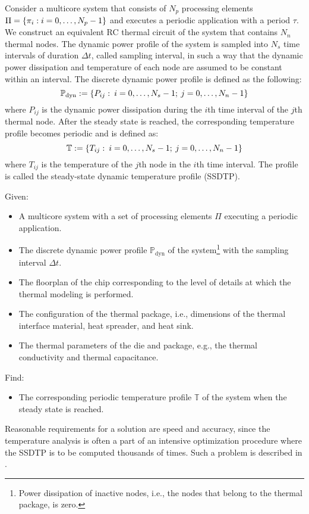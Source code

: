 Consider a multicore system that consists of $N_p$ processing elements $\Pi = \{
\pi_i: i = 0, \dots, N_p - 1 \}$ and executes a periodic application with a
period $\tau$. We construct an equivalent RC thermal circuit of the system that
contains $N_n$ thermal nodes. The dynamic power profile of the system is sampled
into $N_s$ time intervals of duration $\Delta t$, called sampling interval, in
such a way that the dynamic power dissipation and temperature of each node are
assumed to be constant within an interval. The discrete dynamic power profile is
defined as the following:
\[
  \mathbb{P}_\text{dyn} := \{ P_{ij}: \: i = 0, \dots, N_s - 1; \: j = 0, \dots, N_n - 1 \}
\]
where $P_{ij}$ is the dynamic power dissipation during the $i$th time interval
of the $j$th thermal node. After the steady state is reached, the corresponding
temperature profile becomes periodic and is defined as:
\[
  \mathbb{T} := \{ T_{ij}: \: i = 0, \dots, N_s - 1; \: j = 0, \dots, N_n - 1 \}
\]
where $T_{ij}$ is the temperature of the $j$th node in the $i$th time interval.
The profile is called the steady-state dynamic temperature profile (SSDTP).

Given:
\begin{itemize}

\item A multicore system with a set of processing elements $\Pi$ executing a
periodic application.

\item The discrete dynamic power profile $\mathbb{P}_\text{dyn}$ of the
system\footnote{Power dissipation of inactive nodes, i.e., the nodes that belong
to the thermal package, is zero.} with the sampling interval $\Delta t$.

\item The floorplan of the chip corresponding to the level of details at which
the thermal modeling is performed.

\item The configuration of the thermal package, i.e., dimensions of the thermal
interface material, heat spreader, and heat sink.

\item The thermal parameters of the die and package, e.g., the thermal
conductivity and thermal capacitance.

\end{itemize}

Find:
\begin{itemize}

\item The corresponding periodic temperature profile $\mathbb{T}$ of the system
when the steady state is reached.

\end{itemize}
Reasonable requirements for a solution are speed and accuracy, since the
temperature analysis is often a part of an intensive optimization procedure
where the SSDTP is to be computed thousands of times. Such a problem is
described in .

